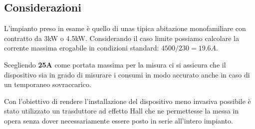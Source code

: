 \subsection{Considerazioni}
L'impianto preso in esame è quello di unas tipica abitazione monofamiliare con
contratto da 3kW o 4.5kW. Considerando il caso limite possiamo calcolare la
corrente massima erogabile in condizioni standard: $4500/230 = 19.6A$.

Scegliendo \textbf{25A} come portata massima per la misura ci si assicura che il
dispositivo sia in grado di misurare i consumi in modo accurato anche in caso di
un temporaneo sovraccarico.

Con l'obiettivo di rendere l'installazione del dispositivo meno invasiva
possibile è stato utilizzato un trasduttore ad effetto Hall che ne permettesse
la messa in opera senza dover necessariamente essere posto in serie all'intero
impianto.